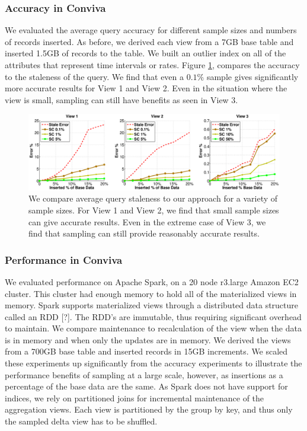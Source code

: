 \subsubsection{Accuracy in Conviva}
We evaluated the average query accuracy for different sample sizes and numbers of records inserted.
As before, we derived each view from a 7GB base table and inserted 1.5GB of records to the table. 
We built an outlier index on all of the attributes that represent time intervals or rates.
Figure \ref{exp5conviva}, compares the accuracy to the staleness of the query.
We find that even a $0.1\%$ sample gives significantly more accurate results for View 1 and View 2.
Even in the situation where the view is small, sampling can still have benefits as seen in View 3.

\begin{figure}[ht!]
\label{exp5conviva}
\hspace{-3.5em}
\includegraphics[scale=0.22]{exp/exp5-coniva-accuracy-woutlier.eps}
 \caption{We compare average query staleness to our approach for a variety of sample sizes. For View 1 and View 2, we find that small sample sizes can give accurate results. Even in the extreme case of View 3, we find that sampling can still provide reasonably accurate results.}
\end{figure}

\subsubsection{Performance in Conviva}
We evaluated performance on Apache Spark, on a 20 node r3.large Amazon EC2 cluster. 
This cluster had enough memory to hold all of the materialized views in memory. 
Spark supports materialized views through a distributed data structure called an RDD [?].
The RDD's are immutable, thus requiring significant overhead to maintain.
We compare maintenance to recalculation of the view when the data is in memory and when only the updates are in memory. 
We derived the views from a 700GB base table and inserted records in 15GB increments. 
We scaled these experiments up significantly from the accuracy experiments to illustrate the performance benefits of sampling at a large scale, however, as insertions as a percentage of the base data are the same.
As Spark does not have support for indices, we rely on partitioned joins for incremental maintenance of the aggregation views.
Each view is partitioned by the group by key, and thus only the sampled delta view has to be shuffled. 

